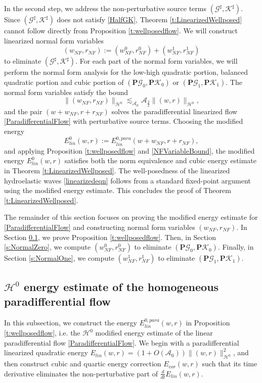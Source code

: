 \documentclass[10pt]{amsart}
\theoremstyle{remark}
\theoremstyle{definition}
\numberwithin{equation}{section}
\renewcommand{\H}{{\mathcal H }}
\newcommand{\f}{\frac}
\newcommand{\nP}{{\mathbf P}}
\newcommand{\CalAZ}{{\mathcal{A}_0}}
\begin{document}
In the second step, we address the non-perturbative source terms $(\mathcal{G}^\sharp, \mathcal{K}^\sharp)$.
Since $(\mathcal{G}^\sharp, \mathcal{K}^\sharp)$ does not satisfy \eqref{HalfGK}, Theorem \ref{t:LinearizedWellposed} cannot follow  directly from  Proposition \ref{t:wellposedflow}.
We will construct linearized normal form variables 
\begin{equation*}
    (w_{NF}, r_{NF}) :=(w_{NF}^0, r_{NF}^0) + (w_{NF}^1, r_{NF}^1)
\end{equation*}
 to eliminate $(\mathcal{G}^\sharp, \mathcal{K}^\sharp)$.
For each part of the normal form variables, we will perform the normal form analysis for the low-high quadratic portion, balanced quadratic portion and cubic portion of $(\nP\mathcal{G}_0, \nP\mathcal{K}_0)$ or $(\nP\mathcal{G}_1, \nP\mathcal{K}_1)$.
The normal form variables satisfy the bound
\begin{equation} \label{NFVariableBound}
    \| (w_{NF}, r_{NF})\|_{\H^0} \lesssim_\CalAZ \mathcal{A}_\f32 \| (w,r)\|_{\H^0},
\end{equation}
and the pair $(w+w_{NF}, r+r_{NF})$ solves the paradifferential linearized flow \eqref{ParadifferentialFlow} with perturbative source terms.
Choosing the modified energy
\begin{equation*}
 E^{0}_{lin}(w,r) := E^{0,para}_{lin} (w+w_{NF}, r+r_{NF}),
\end{equation*}
and applying Proposition \ref{t:wellposedflow} and \eqref{NFVariableBound},
the modified energy $E^{0}_{lin}(w,r)$ satisfies both the norm equivalence and cubic energy estimate in Theorem \ref{t:LinearizedWellposed}.
The well-posedness of the linearized hydroelastic waves \eqref{linearizedeqn} follows from a standard fixed-point argument using the modified energy estimate.
This concludes the proof of Theorem \ref{t:LinearizedWellposed}.

The remainder of this section focuses on proving the modified energy estimate for \eqref{ParadifferentialFlow} and constructing normal form variables $(w_{NF}, r_{NF})$.
In Section \ref{s:HomoFlow}, we prove Proposition \ref{t:wellposedflow}.
Then, in Section \ref{s:NormalZero}, we compute $(w_{NF}^0, r_{NF}^0)$ to eliminate $(\nP\mathcal{G}_0, \nP\mathcal{K}_0)$.
Finally, in Section \ref{s:NormalOne}, we compute $(w_{NF}^1, r_{NF}^1)$ to eliminate $(\nP\mathcal{G}_1, \nP\mathcal{K}_1)$.

\subsection{$\H^0$ energy estimate of the homogeneous paradifferential flow} \label{s:HomoFlow}
In this subsection, we construct the energy $E^{0,para}_{lin}(w,r)$ in Proposition \ref{t:wellposedflow}, i.e. the $\H^0$ modified energy estimate of the linear paradifferential flow \eqref{ParadifferentialFlow}.
We begin with a paradifferential linearized quadratic energy $E_{lin}(w,r) = (1+O(\CalAZ)) \|(w,r)\|_{\H^0}^2$, and then construct cubic and quartic energy correction $E_{cor}(w,r)$ such that its time derivative eliminates the non-perturbative part of $\frac{d}{dt}E_{lin}(w,r)$.
\end{document}
